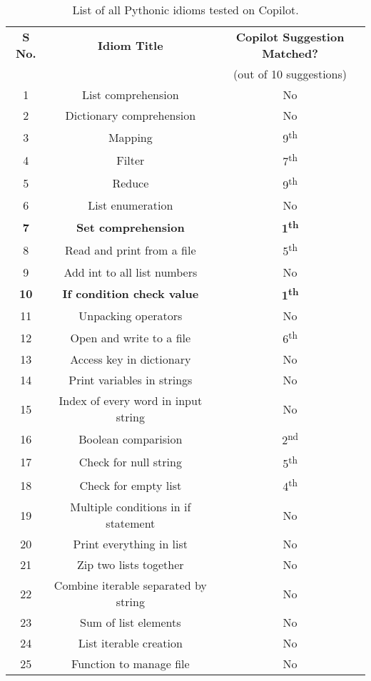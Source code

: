 \begin{table}[hbt!]

    \begin{tabular}{|c|c|c|}
        \hline
        \centering
         \textbf{S No.} & \textbf{Idiom Title} & \textbf{Copilot Suggestion Matched?}  \\
         & & (out of 10 suggestions) \\
         \hline
         1 & List comprehension & No \\
         \hline
         2 & Dictionary comprehension & No \\
         \hline
         3 & Mapping & 9\textsuperscript{th} \\
         \hline
         4 & Filter &  7\textsuperscript{th} \\
         \hline
         5 & Reduce & 9\textsuperscript{th} \\
         \hline
         6 & List enumeration & No \\
         \hline
         \textbf{7} & \textbf{Set comprehension} & \textbf{1\textsuperscript{th}} \\
         \hline
         8 & Read and print from a file & 5\textsuperscript{th} \\
         \hline
         9 & Add int to all list numbers & No \\
         \hline
         \textbf{10} & \textbf{If condition check value} & \textbf{1\textsuperscript{th}} \\
         \hline
         11 & Unpacking operators & No \\
         \hline
         12 & Open and write to a file & 6\textsuperscript{th} \\
         \hline
         13 & Access key in dictionary & No \\
         \hline
         14 & Print variables in strings & No \\
         \hline
         15 & Index of every word in input string & No \\
         \hline
         16 & Boolean comparision & 2\textsuperscript{nd} \\
         \hline
         17 & Check for null string & 5\textsuperscript{th} \\
         \hline
         18 & Check for empty list & 4\textsuperscript{th} \\
         \hline
         19 & Multiple conditions in if statement & No \\
         \hline
         20 & Print everything in list & No \\
         \hline
         21 & Zip two lists together & No \\
         \hline
         22 & Combine iterable separated by string & No \\
         \hline
         23 & Sum of list elements & No \\
         \hline
         24 & List iterable creation & No \\
         \hline
         25 & Function to manage file & No \\
         \hline
    \end{tabular}
    \caption{List of all Pythonic idioms tested on Copilot.}
    \label{tab:all_idioms}
\end{table}
